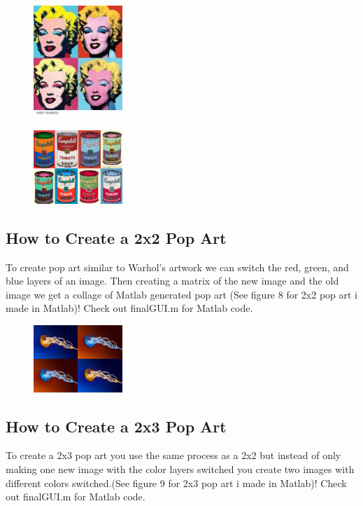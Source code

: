 \documentclass[a4paper]{article}
\begin{document}
\begin{figure}
\centering
\includegraphics[width=0.3\textwidth]{ex2.jpg}
\caption{\label{fig:Warhol example 2}}
\end{figure}

\begin{figure}
\centering
\includegraphics[width=0.3\textwidth]{ex3.jpg}
\caption{\label{fig:Warhol example 3}}
\end{figure}

\subsection{How to Create a 2x2 Pop Art}
To create pop art similar to Warhol's artwork we can switch the red, green, and blue layers of an image. Then creating a matrix of the new image and the old image we get a collage of Matlab generated pop art (See figure 8 for 2x2 pop art i made in Matlab)! Check out finalGUI.m for Matlab code.

\begin{figure}
\centering
\includegraphics[width=0.3\textwidth]{vallex1.PNG}
\caption{\label{fig:Vallefuoco example 1}}
\end{figure}

\subsection{How to Create a 2x3 Pop Art}
To create a 2x3 pop art you use the same process as a 2x2 but instead of only making one new image with the color layers switched you create two images with different colors switched.(See figure 9 for 2x3 pop art i made in Matlab)! Check out finalGUI.m for Matlab code.
\end{document}
